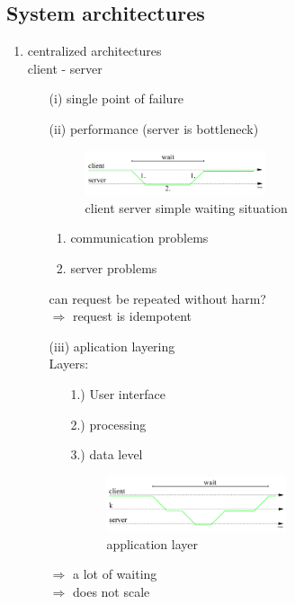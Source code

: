 \documentclass[ngerman,a4paper]{report}
\begin{document}
\subsection{System architectures}
\begin{enumerate}
\item centralized architectures\\
client - server\\
\begin{itemize}
\item[(i)] single point of failure
\item[(ii)] performance (server is bottleneck)\\
\begin{figure}
	\centering
	\includegraphics[width=200px]{gfx/cs_simple_wait.png}
	\caption{client server simple waiting situation}
	\label{img:cs_simple_wait}
\end{figure}
\begin{enumerate}
\item communication problems\\
\item server problems\\
\end{enumerate}
can request be repeated without harm?\\
$\Rightarrow$ request is idempotent
\item[(iii)] aplication layering\\
Layers:\begin{itemize}
\item[1.)] User interface
\item[2.)] processing
\item[3.)] data level
\begin{figure}
	\centering
	\includegraphics[width=200px]{gfx/cs_app_layer.png}
	\caption{application layer}
	\label{img:cs_app_layer}
\end{figure}
\end{itemize}
$\Rightarrow$ a lot of waiting\\
$\Rightarrow$ does not scale\\
\end{itemize}

\end{enumerate}
\end{document}
